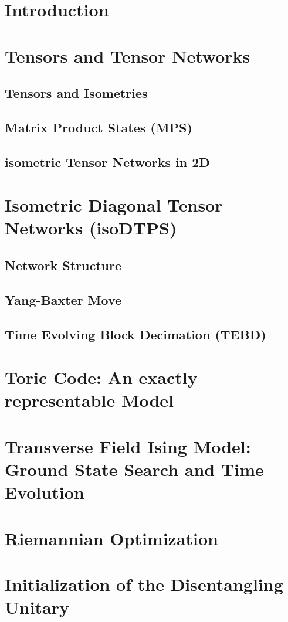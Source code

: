\documentclass[encoding=utf8,british]{template/thesis}
\begin{document}
	\chapter{Introduction}
	
	\chapter{Tensors and Tensor Networks}
	
	\section{Tensors and Isometries}
	
	\section{Matrix Product States (MPS)}
	
	\section{isometric Tensor Networks in 2D}
	
	\chapter{Isometric Diagonal Tensor Networks (isoDTPS)}
		
	\section{Network Structure}
	
	\section{Yang-Baxter Move}
	
	\section{Time Evolving Block Decimation (TEBD)}
	
	\chapter{Toric Code: An exactly representable Model}
	
	\chapter{Transverse Field Ising Model: Ground State Search and Time Evolution}
	
	\appendix
	
	\chapter{Riemannian Optimization}
	
	\chapter{Initialization of the Disentangling Unitary}
	
	\backmatter
	\printbibliography
	
\end{document}
